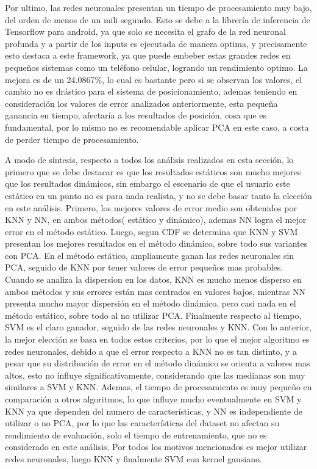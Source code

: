 Por ultimo, las redes neuronales presentan un tiempo de procesamiento muy bajo, del orden de menos de un mili segundo. Esto se debe a la librería de inferencia de Tensorflow para android, ya que solo se necesita el grafo de la red neuronal profunda y a partir de los inputs es ejecutada de manera optima, y precisamente esto destaca a este framework, ya que puede embeber estas grandes redes en pequeños sistemas como un teléfono celular, logrando un rendimiento optimo. La mejora es de un 24.0867\%, lo cual es bastante pero si se observan los valores, el cambio no es drástico para el sistema de posicionamiento, ademas teniendo en consideración los valores de error analizados anteriormente, esta pequeña ganancia en tiempo, afectaría a los resultados de posición, cosa que es fundamental, por lo mismo no es recomendable aplicar PCA en este caso, a costa de perder tiempo de procesamiento.


A modo de síntesis, respecto a todos los análisis realizados en esta sección, lo primero que se debe destacar es que los resultados estáticos son mucho mejores que los resultados dinámicos, sin embargo el escenario de que el usuario este estático en un punto no es para nada realista, y no se debe basar tanto la elección en este análisis. Primero, los mejores valores de error medio son obtenidos por KNN y NN, en ambos métodos( estático y dinámico), ademas NN logra el mejor error en el método estático. Luego, segun CDF se determina que KNN y SVM presentan los mejores resultados en el método dinámico, sobre todo sus variantes con PCA. En el método estático, ampliamente ganan las redes neuronales sin PCA, seguido de KNN por tener valores de error pequeños mas probables. Cuando se analiza la dispersion en los datos, KNN es mucho menos disperso en ambos métodos y sus errores están mas centrados en valores bajos, mientras NN presenta mucho mayor dispersión en el método dinámico, pero casi nada en el método estático, sobre todo al no utilizar PCA. Finalmente respecto al tiempo, SVM es el claro ganador, seguido de las redes neuronales y KNN. Con lo anterior, la mejor elección se basa en todos estos criterios, por lo que el mejor algoritmo es redes neuronales, debido a que el error respecto a KNN no es tan distinto, y a pesar que su distribución de error en el método dinámico se orienta a valores mas altos, esto no influye significativamente, considerando que las medianas son muy similares a SVM y KNN. Ademas, el tiempo de procesamiento es muy pequeño en comparación a otros algoritmos, lo que influye mucho eventualmente en SVM y KNN ya que dependen del numero de características, y NN es independiente de utilizar o no PCA, por lo que las características del dataset no afectan su rendimiento de evaluación, solo el tiempo de entrenamiento, que no es considerado en este análisis. Por todos los motivos mencionados es mejor utilizar redes neuronales, luego KNN y finalmente SVM con kernel gausiano.

